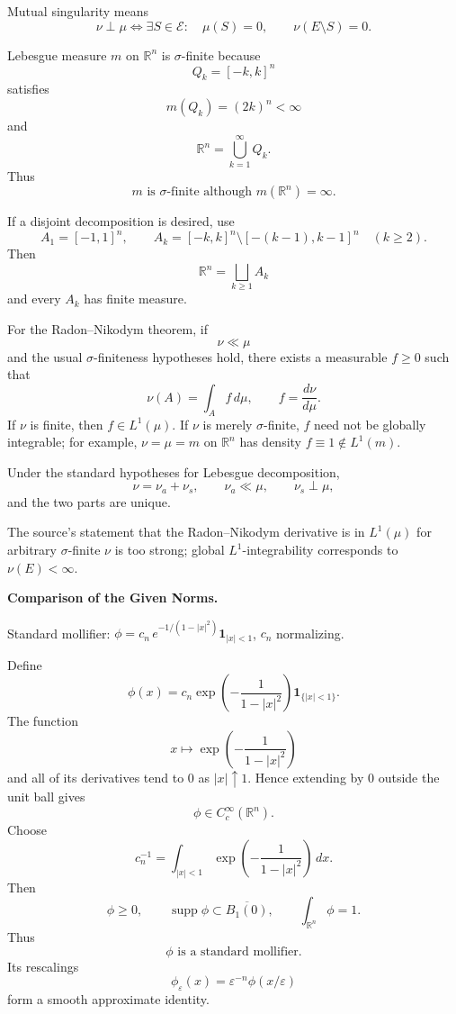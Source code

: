 \begin{solution}
Mutual singularity means
\[
\boxed{
\nu\perp\mu
\iff
\exists S\in\mathcal E:
\quad
\mu(S)=0,
\qquad
\nu(E\setminus S)=0.
}
\]

Lebesgue measure \(m\) on \(\mathbb R^n\) is \(\sigma\)-finite because
\[
Q_k=[-k,k]^n
\]
satisfies
\[
m(Q_k)=(2k)^n<\infty
\]
and
\[
\mathbb R^n=\bigcup_{k=1}^{\infty}Q_k.
\]
Thus
\[
\boxed{
m\text{ is }\sigma\text{-finite although }m(\mathbb R^n)=\infty.
}
\]

If a disjoint decomposition is desired, use
\[
A_1=[-1,1]^n,
\qquad
A_k=[-k,k]^n\setminus[-(k-1),k-1]^n
\quad(k\ge2).
\]
Then
\[
\mathbb R^n=\bigsqcup_{k\ge1}A_k
\]
and every \(A_k\) has finite measure.

For the Radon--Nikodym theorem, if
\[
\nu\ll\mu
\]
and the usual \(\sigma\)-finiteness hypotheses hold, there exists a measurable
\(f\ge0\) such that
\[
\boxed{
\nu(A)=\int_A f\,d\mu,
\qquad
f=\frac{d\nu}{d\mu}.
}
\]
If \(\nu\) is finite, then \(f\in L^1(\mu)\). If \(\nu\) is merely
\(\sigma\)-finite, \(f\) need not be globally integrable; for example,
\(\nu=\mu=m\) on \(\mathbb R^n\) has density \(f\equiv1\notin L^1(m)\).

Under the standard hypotheses for Lebesgue decomposition,
\[
\boxed{
\nu=\nu_a+\nu_s,
\qquad
\nu_a\ll\mu,
\qquad
\nu_s\perp\mu,
}
\]
and the two parts are unique.

The source's statement that the Radon--Nikodym derivative is in \(L^1(\mu)\) for arbitrary
\(\sigma\)-finite \(\nu\) is too strong; global \(L^1\)-integrability corresponds to
\(\nu(E)<\infty\).
\end{solution}


\begin{problem}[CP-II-0541]
\label{prob:cp-ii-0541}
\textbf{Comparison of the Given Norms.}

\hspace*{1.5em}Standard mollifier: $\phi=c_n\,e^{-1/(1-|x|^2)}\mathbf 1_{|x|<1}$, $c_n$ normalizing.
\end{problem}

\begin{solution}
Define
\[
\phi(x)
=
c_n
\exp\left(
-\frac1{1-|x|^2}
\right)
\mathbf1_{\{|x|<1\}}.
\]
The function
\[
x\mapsto
\exp\left(
-\frac1{1-|x|^2}
\right)
\]
and all of its derivatives tend to \(0\) as \(|x|\uparrow1\). Hence extending by \(0\)
outside the unit ball gives
\[
\phi\in C_c^\infty(\mathbb R^n).
\]
Choose
\[
c_n^{-1}
=
\int_{|x|<1}
\exp\left(
-\frac1{1-|x|^2}
\right)\,dx.
\]
Then
\[
\phi\ge0,
\qquad
\operatorname{supp}\phi\subset\overline{B_1(0)},
\qquad
\int_{\mathbb R^n}\phi=1.
\]
Thus
\[
\boxed{
\phi
\text{ is a standard mollifier}.
}
\]
Its rescalings
\[
\phi_\varepsilon(x)
=
\varepsilon^{-n}\phi(x/\varepsilon)
\]
form a smooth approximate identity.
\end{solution}


